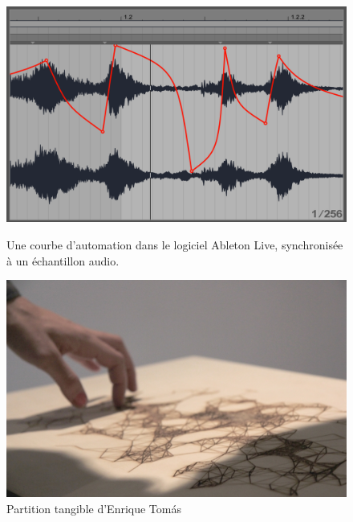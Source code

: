 \begin{figure}[!htbp]
	\captionsetup{format=plain}%
	\centering
	\begin{minipage}[t]{0.48\textwidth}
		\includegraphics[width=\linewidth]{gfx/03_gesture/AbletonLiveAutomation_72dpi.png}
		\caption[Une courbe d'automation dans le logiciel Ableton Live]{Une courbe d'automation dans le logiciel Ableton Live, synchronisée à un échantillon audio.}
		\label{fig:gesture:automation}
	\end{minipage}
	\hspace{.02\linewidth}
	\begin{minipage}[t]{0.48\textwidth}
	  \includegraphics[width=\linewidth]{gfx/03_gesture/EnriqueThomas-TangibleScore.jpg}
		\caption[Partition tangible d'Enrique Tomás]{Partition tangible d'Enrique Tomás}
		\label{fig:gesture:tangible_score}
	\end{minipage}
\end{figure}
